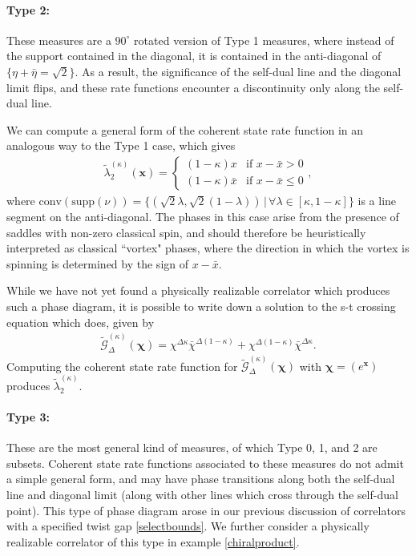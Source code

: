 \documentclass[a4paper,11pt]{article}
\theoremstyle{plain}
\theoremstyle{definition}
\theoremstyle{remark}
\newcommand{\bs}[1]{\boldsymbol{#1}}
\newcommand{\ba}{\begin{equation} \begin{aligned}}
\newcommand{\ea}{\end{aligned} \end{equation}}
\newcommand{\De}{\Delta}
\begin{document}
\paragraph{Type 2:} These measures are a $90^{\circ}$ rotated version of Type 1 measures, where instead of the support contained in the diagonal, it is contained in the anti-diagonal of $\{\eta +\bar{\eta} = \sqrt{2}\}$. As a result, the significance of the self-dual line and the diagonal limit flips, and these rate functions encounter a discontinuity only along the self-dual line. 

We can compute a general form of the coherent state rate function in an analogous way to the Type 1 case, which gives
\ba
\tilde{\lambda}_2^{(\kappa)}(\bs{x}) = \begin{cases}
   (1-\kappa) x & \text{if } x  - \bar{x} > 0 \\
    (1-\kappa) \bar{x} & \text{if } x -\bar{x} \leq 0 
\end{cases},
\ea
where $\mathrm{conv}(\mathrm{supp}(\nu)) = \{(\sqrt{2} \lambda, \sqrt{2}(1- \lambda))\,|\, \forall \lambda\in[\kappa,1-\kappa] \}$ is a line segment on the anti-diagonal. The phases in this case arise from the presence of saddles with non-zero classical spin, and should therefore be heuristically interpreted as classical ``vortex" phases, where the direction in which the vortex is spinning is determined by the sign of $x - \bar{x}$. 

While we have not yet found a physically realizable correlator which produces such a phase diagram, it is possible to write down a solution to the s-t crossing equation which does, given by
\ba
\tilde{\mathcal{G}}_\De^{(\kappa)}(\bs{\chi}) = \chi^{\De \kappa}\bar{\chi}^{\De(1- \kappa)} + \chi^{\De(1-\kappa)}\bar{\chi}^{\De \kappa}.
\ea
Computing the coherent state rate function for $\tilde{\mathcal{G}}_\De^{(\kappa)}(\bs{\chi})$  with $\bs{\chi} = ( e^{\bs{x}})$ produces $\tilde{\lambda}_2^{(\kappa)}$.

\paragraph{Type 3:} These are the most general kind of measures, of which Type 0, 1, and 2 are subsets. Coherent state rate functions associated to these measures do not admit a simple general form, and may have phase transitions along both the self-dual line and diagonal limit (along with other lines which cross through the self-dual point). This type of phase diagram arose in our previous discussion of correlators with a specified twist gap \ref{selectbounds}. We further consider a physically realizable correlator of this type in example \ref{chiralproduct}.
\end{document}
